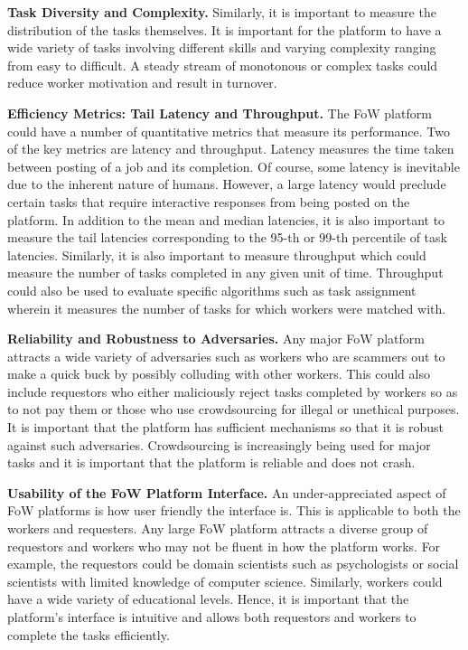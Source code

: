 \textbf{Task Diversity and Complexity.}
Similarly, it is important to measure the distribution of the tasks themselves.
It is important for the platform to have a wide variety of tasks involving different skills
and varying complexity ranging from easy to difficult.
A steady stream of monotonous or complex tasks could reduce worker motivation and result in turnover.

\textbf{Efficiency Metrics: Tail Latency and Throughput.}
The FoW platform could have a number of quantitative metrics that measure its performance.
Two of the key metrics are latency and throughput.
Latency measures the time taken between posting of a job and its completion.
Of course, some latency is inevitable due to the inherent nature of humans.
However, a large latency would preclude certain tasks that require interactive responses from being posted on the platform.
In addition to the mean and median latencies, it is also important to measure
the tail latencies corresponding to the 95-th or 99-th percentile of task latencies.
Similarly, it is also important to measure throughput which could measure
the number of tasks completed in any given unit of time.
Throughput could also be used to evaluate specific algorithms such as task assignment
wherein it measures the number of tasks for which workers were matched with.

\textbf{Reliability and Robustness to Adversaries.}
Any major FoW platform attracts a wide variety of adversaries
such as workers who are scammers out to make a quick buck by possibly colluding with other workers.
This could also include requestors who either maliciously reject tasks completed by workers so as to not pay them or those who use crowdsourcing for illegal or unethical purposes.
It is important that the platform has sufficient mechanisms so that it is robust against such adversaries.
Crowdsourcing is increasingly being used for major tasks and it is important that the platform is reliable and does not crash.

\textbf{Usability of the FoW Platform Interface.}
An under-appreciated aspect of FoW platforms is how user friendly the interface is.
This is applicable to both the workers and requesters.
Any large FoW platform attracts a diverse group of requestors and workers
who may not be fluent in how the platform works.
For example, the requestors could be domain scientists such as psychologists or social scientists
with limited knowledge of computer science.
Similarly, workers could have a wide variety of educational levels.
Hence, it is important that the platform's interface is intuitive and allows both requestors and workers to complete the tasks efficiently.

